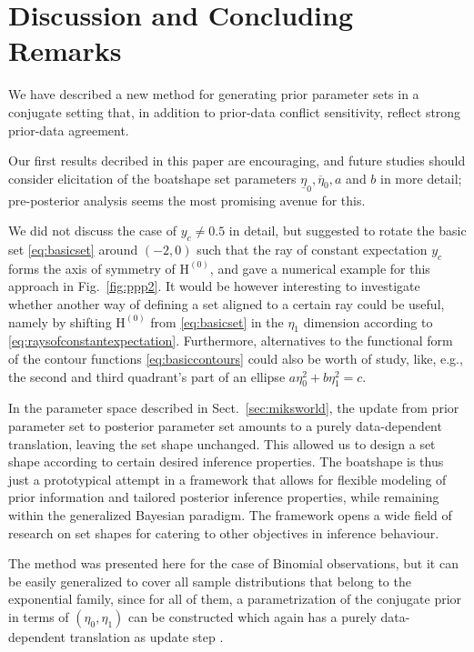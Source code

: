 \documentclass[runningheads,a4paper]{llncs}
\newcommand{\uz}{^{(0)}} %
\newcommand{\ul}[1]{\underline{#1}}
\newcommand{\ol}[1]{\overline{#1}}
\def\EZ{\mathrm{H}\uz}
\newcommand{\ez}{\eta_0}
\newcommand{\eo}{\eta_1}
\def\ezl{\ul{\eta}_0}
\def\ezu{\ol{\eta}_0}
\begin{document}
\section{Discussion and Concluding Remarks}
\label{sec:concluding}

We have described a new method for generating prior parameter sets in a conjugate setting
that, in addition to prior-data conflict sensitivity, reflect strong prior-data agreement.

Our first results decribed in this paper are encouraging,
and future studies should consider elicitation of the boatshape set parameters $\ezl, \ezu, a$ and $b$ in more detail;
pre-posterior analysis seems the most promising avenue for this.

We did not discuss the case of $y_c \neq 0.5$ in detail,
but suggested to rotate the basic set \eqref{eq:basicset} around $(-2,0)$
such that the ray of constant expectation $y_c$ forms the axis of symmetry of $\EZ$,
and gave a numerical example for this approach in Fig.~\ref{fig:ppp2}.
It would be however interesting to investigate whether another way of defining a set aligned to a certain ray could be useful,
namely by shifting $\EZ$ from \eqref{eq:basicset} in the $\eo$ dimension according to \eqref{eq:raysofconstantexpectation}.
Furthermore, alternatives to the functional form of the contour functions \eqref{eq:basiccontours} could also be worth of study,
like, e.g., the second and third quadrant's part of an ellipse $a\ez^2 + b\eo^2 = c$.

In the parameter space described in Sect.~\ref{sec:miksworld},
the update from prior parameter set to posterior parameter set
amounts to a purely data-dependent translation, leaving the set shape unchanged.
This allowed us to design a set shape according to certain desired inference properties.
The boatshape is thus just a prototypical attempt in a framework that allows
for flexible modeling of prior information and tailored posterior inference properties,
while remaining within the generalized Bayesian paradigm.
The framework opens a wide field of research on set shapes for catering to other objectives in inference behaviour.

The method was presented here for the case of Binomial observations,
but it can be easily generalized to cover all sample distributions that belong to the exponential family,
since for all of them, a parametrization of the conjugate prior in terms of $(\ez, \eo)$ can be constructed
which again has a purely data-dependent translation as update step \cite[p.~56]{2015:mik-isipta}.





\end{document}
